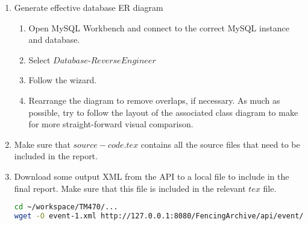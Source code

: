 \begin{enumerate}
  \item Generate effective database ER diagram
  \begin{enumerate}
    \item Open MySQL Workbench and connect to the correct MySQL instance
    and database.
    \item Select \(Database\)-\(Reverse Engineer\)
    \item Follow the wizard.
    \item Rearrange the diagram to remove overlaps, if necessary. As much as
    possible, try to follow the layout of the associated class diagram to make
    for more straight-forward visual comparison.
  \end{enumerate}
  \item Make sure that \(source-code.tex\) contains all the source files that
  need to be included in the report.
  \item Download some output XML from the API to a local file to include in the
  final report. Make sure that this file is included in the relevant \(tex\)
  file.
\begin{lstlisting}[language=bash, caption={API Downloads}]
cd ~/workspace/TM470/...
wget -O event-1.xml http://127.0.0.1:8080/FencingArchive/api/event/1
\end{lstlisting}
\end{enumerate}
